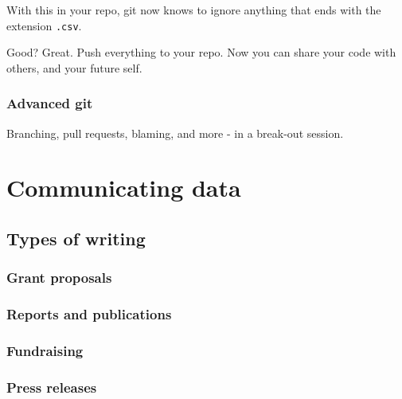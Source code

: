 \documentclass[
]{book}
\begin{document}
With this in your repo, git now knows to ignore anything that ends with the extension \texttt{.csv}.

Good? Great. Push everything to your repo. Now you can share your code with others, and your future self.

\hypertarget{advanced-git}{%
\section*{Advanced git}\label{advanced-git}}

Branching, pull requests, blaming, and more - in a break-out session.

\hypertarget{part-communicating-data}{%
\part{Communicating data}\label{part-communicating-data}}

\hypertarget{types-of-writing}{%
\chapter{Types of writing}\label{types-of-writing}}

\hypertarget{grant-proposals}{%
\section*{Grant proposals}\label{grant-proposals}}

\hypertarget{reports-and-publications}{%
\section*{Reports and publications}\label{reports-and-publications}}

\hypertarget{fundraising}{%
\section*{Fundraising}\label{fundraising}}

\hypertarget{press-releases}{%
\section*{Press releases}\label{press-releases}}
\end{document}
